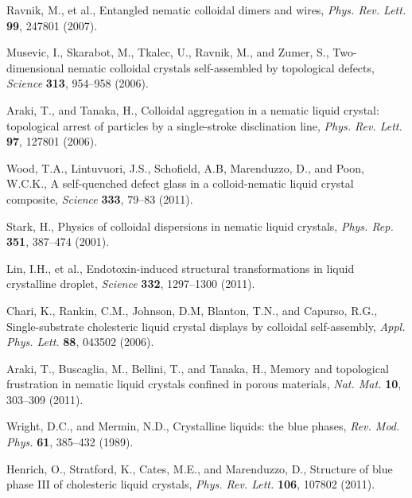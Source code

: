 \documentclass[12pt]{article}
\begin{document}
\pagebreak

\begin{thebibliography}{99}

Ravnik, M., et al.,
Entangled nematic colloidal dimers and wires, 
{\it Phys. Rev. Lett.} {\bf 99}, 247801 (2007).

Musevic, I., Skarabot, M., Tkalec, U., Ravnik, M., and Zumer, S.,
Two-dimensional nematic colloidal crystals self-assembled by topological
defects,
{\it Science} {\bf 313}, 954--958 (2006).

Araki, T., and Tanaka, H.,
Colloidal aggregation in a nematic liquid crystal: topological arrest of
particles by a single-stroke disclination line,
{\it Phys. Rev. Lett.} {\bf 97}, 127801 (2006).

Wood, T.A., Lintuvuori, J.S., Schofield, A.B, Marenduzzo, D., and
Poon, W.C.K.,
A self-quenched defect glass in a colloid-nematic liquid crystal composite,
{\it Science} {\bf 333}, 79--83 (2011).

 Stark, H.,
Physics of colloidal dispersions in nematic liquid crystals,
{\it Phys. Rep.} {\bf 351}, 387--474 (2001).

Lin, I.H., et al.,
Endotoxin-induced structural transformations in liquid crystalline droplet,
{\it Science} {\bf 332}, 1297--1300 (2011).

Chari, K., Rankin, C.M., Johnson, D.M, Blanton, T.N., and Capurso, R.G.,
Single-substrate cholesteric liquid crystal displays by colloidal
self-assembly,
{\it Appl. Phys. Lett.} {\bf 88}, 043502 (2006).

Araki, T., Buscaglia, M., Bellini, T., and Tanaka, H.,
Memory and topological frustration in nematic liquid crystals confined
in porous materials, {\it Nat. Mat.} {\bf 10}, 303--309 (2011).

 Wright, D.C., and Mermin, N.D.,
Crystalline liquids: the blue phases, {\it Rev. Mod. Phys.} {\bf 61},
385--432 (1989).

 Henrich, O., Stratford, K., Cates, M.E., and Marenduzzo, D.,
 Structure of blue phase III of cholesteric liquid crystals,
{\it Phys. Rev. Lett.} {\bf 106}, 107802 (2011).


\end{thebibliography}
\end{document}
